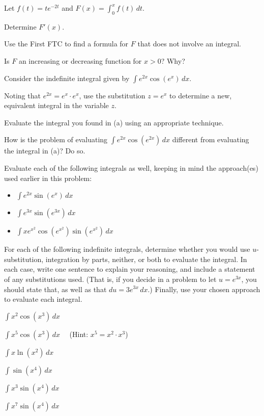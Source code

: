 \begin{exercises} 
  \item Let $f(t) = te^{-2t}$ and $F(x) = \int_0^x f(t) \, dt$.
  	\ba
		\item Determine $F'(x)$.
		\item Use the First FTC to find a formula for $F$ that does not involve an integral.
		\item Is $F$ an increasing or decreasing function for $x > 0$?  Why?
	\ea	
	
  \item Consider the indefinite integral given by $\int e^{2x} \cos(e^x) \, dx$.
  	\ba
		\item Noting that $e^{2x} = e^x \cdot e^x$, use the substitution $z = e^{x}$ to determine a new, equivalent integral in the variable $z$.
		\item Evaluate the integral you found in (a) using an appropriate technique.
		\item How is the problem of evaluating $\int e^{2x} \cos(e^{2x}) \, dx$ different from evaluating the integral in (a)?  Do so.
		\item Evaluate each of the following integrals as well, keeping in mind the approach(es) used earlier in this problem:
		\begin{itemize}
			\item $\int e^{2x} \sin(e^x) \, dx$
			\item $\int e^{3x} \sin(e^{3x}) \, dx$
			\item $\int xe^{x^2} \cos(e^{x^2}) \sin(e^{x^2}) \, dx$
		\end{itemize}
	\ea
	
	
  \item For each of the following indefinite integrals, determine whether you would use $u$-substitution, integration by parts, neither, or both to evaluate the integral.  In each case, write one sentence to explain your reasoning, and include a statement of any substitutions used.  (That is, if you decide in a problem to let $u = e^{3x}$, you should state that, as well as that $du = 3e^{3x} \, dx$.)  Finally, use your chosen approach to evaluate each integral.
\end{exercises}
	\ba
		\item $\int x^2 \cos(x^3) \, dx$
		\item $\int x^5 \cos(x^3) \, dx$ \ \ (Hint: $x^5 = x^2 \cdot x^3$)
		\item $\int x\ln(x^2) \, dx$
		\item $\int \sin(x^4) \, dx$
		\item $\int x^3 \sin(x^4) \, dx$
		\item $\int x^7 \sin(x^4) \, dx$
	\ea

\afterexercises

